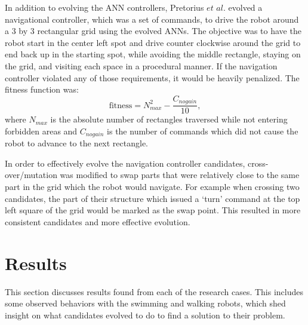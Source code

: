\documentclass{sig-alternate}
\begin{document}
  In addition to evolving the ANN controllers, Pretorius $et$ $al.$ evolved a  navigational controller, which was a set of commands, to drive the robot around a 3 by 3 rectangular grid using the evolved ANNs. The objective was to have the robot start in the center left spot and drive counter clockwise around the grid to end back up in the starting spot, while avoiding the middle rectangle, staying on the grid, and visiting each space in a procedural manner. If the navigation controller violated any of those requirements, it would be heavily penalized. The fitness function was:
\[
  \textrm{fitness} = N_{max}^2 - \frac{C_{nogain}}{10},
\] 
where $N_{max}$ is the absolute number of rectangles traversed while not entering forbidden areas and $C_{nogain}$ is the number of commands which did not cause the robot to advance to the next rectangle.

	In order to effectively evolve the navigation controller candidates, cross-over/mutation was modified to swap parts that were relatively close to the same part in the grid which the robot would navigate. For example when crossing two candidates, the part of their structure which issued a `turn' command at the top left square of the grid would be marked as the swap point. This resulted in more consistent candidates and more effective evolution. 

\section{Results}\label{behavior}
  This section discusses results found from each of the research cases. This includes some observed behaviors with the swimming and walking robots, which shed insight on what candidates evolved to do to find a solution to their problem.
\end{document}

